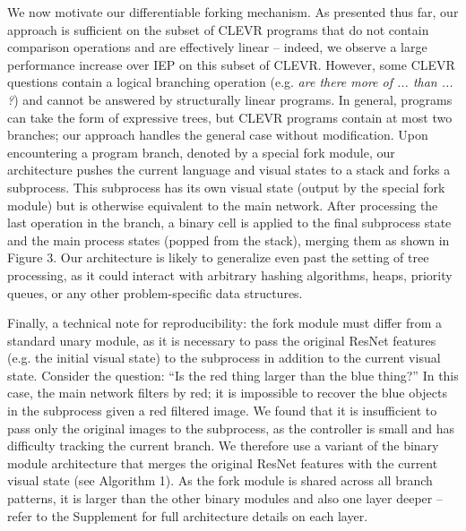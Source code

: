 \documentclass{article}
\begin{document}
We now motivate our differentiable forking mechanism. As presented thus far, our approach is sufficient on the subset of CLEVR programs that do not contain comparison operations and are effectively linear -- indeed, we observe a large performance increase over IEP on this subset of CLEVR. However, some CLEVR questions contain a logical branching operation (e.g. \textit{are there more of ... than ... ?}) and cannot be answered by structurally linear programs. In general, programs can take the form of expressive trees, but CLEVR programs contain at most two branches; our approach handles the general case without modification. Upon encountering a program branch, denoted by a special fork module, our architecture pushes the current language and visual states to a stack and forks a subprocess. This subprocess has its own visual state (output by the special fork module) but is otherwise equivalent to the main network. After processing the last operation in the branch, a binary cell is applied to the final subprocess state and the main process states (popped from the stack), merging them as shown in Figure 3. Our architecture is likely to generalize even past the setting of tree processing, as it could interact with arbitrary hashing algorithms, heaps, priority queues, or any other problem-specific data structures.

Finally, a technical note for reproducibility: the fork module must differ from a standard unary module, as it is necessary to pass the original ResNet features (e.g. the initial visual state) to the subprocess in addition to the current visual state. Consider the question: ``Is the red thing larger than the blue thing?'' In this case, the main network filters by red; it is impossible to recover the blue objects in the subprocess given a red filtered image. We found that it is insufficient to pass only the original images to the subprocess, as the controller is small and has difficulty tracking the current branch. We therefore use a variant of the binary module architecture that merges the original ResNet features with the current visual state (see Algorithm 1). As the fork module is shared across all branch patterns, it is larger than the other binary modules and also one layer deeper -- refer to the Supplement for full architecture details on each layer.
\end{document}
